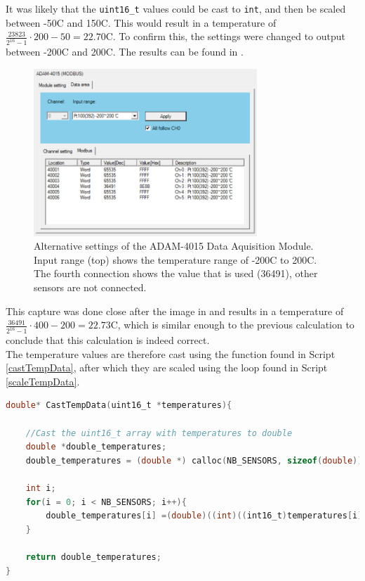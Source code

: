 It was likely that the \verb|uint16_t| values could be cast to \verb|int|, and then be scaled between -50\degree C and 150\degree C. This would result in a temperature of $\frac{23823}{2^{16}-1} \cdot 200-50 = 22.70$\degree C. To confirm this, the settings were changed to output between -200\degree C and 200\degree C. The results can be found in .\\

\begin{figure}[!ht]
  \centering
    \includegraphics[width=0.75\textwidth]{images/ADAM_-200-200.png}
      \caption{Alternative settings of the ADAM-4015 Data Aquisition Module. Input range (top) shows the temperature range of -200\degree C to 200\degree C. The fourth connection shows the value that is used (36491), other sensors are not connected.}\label{fig:ADAM_-200-200}
\end{figure}

This capture was done close after the image in  and results in a temperature of $\frac{36491}{2^{16}-1} \cdot 400-200 = 22.73$\degree C, which is similar enough to the previous calculation to conclude that this calculation is indeed correct.\\

The temperature values are therefore cast using the function found in Script \ref{castTempData}, after which they are scaled using the loop found in Script \ref{scaleTempData}.

\scriptsize
\begin{lstlisting}[language=C,caption={Function used to cast temperature data},label={castTempData}]
double* CastTempData(uint16_t *temperatures){

    //Cast the uint16_t array with temperatures to double
    double *double_temperatures;
    double_temperatures = (double *) calloc(NB_SENSORS, sizeof(double));

    int i;
    for(i = 0; i < NB_SENSORS; i++){
        double_temperatures[i] =(double)((int)((int16_t)temperatures[i]));
    }

    return double_temperatures;
}
\end{lstlisting}
\normalsize

